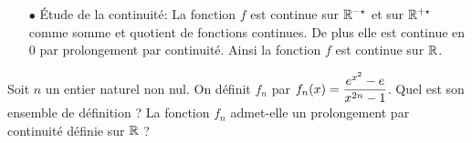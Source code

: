 \documentclass[a4paper, 11pt,reqno]{article}
\begin{document}
\begin{correction}
\begin{itemize}
\begin{itemize}
\begin{itemize}
			            \end{itemize}
		      \end{itemize}
		\item[$\bullet$] \'Etude de la continuit\'e: La fonction $f$ est continue sur $\mathbb{R}^{-\star}$ et sur $\mathbb{R}^{+\star}$ comme somme et quotient de fonctions continues. De plus elle est continue en 0 par prolongement par continuit\'e. Ainsi la fonction $f$ est continue sur $\mathbb{R}$.
	\end{itemize}
\end{correction}
\begin{exercice}   \;
	Soit $n$ un entier naturel non nul. On d\'efinit $f_n$ par $f_n(x)=\displaystyle\frac{e^{x^2}-e}{x^{2n}-1}$. Quel est son ensemble de d\'efinition ? La fonction $f_n$ admet-elle un prolongement par continuit\'e d\'efinie sur $\mathbb{R}$ ?
\end{exercice}
\end{document}
